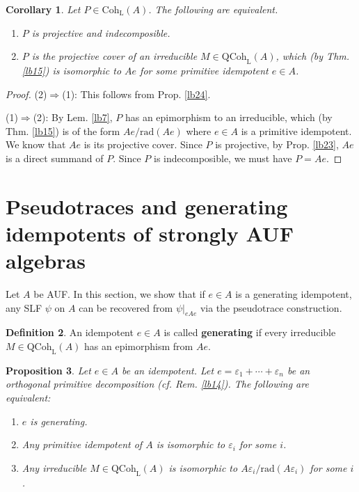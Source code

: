 \documentclass[11pt,b5paper,notitlepage]{article}
\theoremstyle{definition}
\newtheorem{df}{Definition}[section]
\theoremstyle{plain}
\newtheorem{pp}[df]{Proposition}
\newtheorem{co}[df]{Corollary}
\newcommand{\eps}{\varepsilon}
\newcommand{\QC}{\mathrm{QCoh}_{\mathrm L}}
\newcommand{\Coh}{\mathrm{Coh}_{\mathrm L}}
\newcommand{\rad}{\mathrm{rad}}
\numberwithin{equation}{section}
\begin{document}
\begin{co}\label{lb25}
Let $P\in\Coh(A)$. The following are equivalent.
\begin{enumerate}[label=(\arabic*)]
\item $P$ is projective and indecomposible.
\item $P$ is the projective cover of an irreducible $M\in\QC(A)$, which (by Thm. \ref{lb15}) is isomorphic to $Ae$ for some primitive idempotent $e\in A$.
\end{enumerate}
\end{co}


\begin{proof}
(2)$\Rightarrow$(1): This follows from Prop. \ref{lb24}.

(1)$\Rightarrow$(2): By Lem. \ref{lb7}, $P$ has an epimorphism to an irreducible, which (by Thm. \ref{lb15}) is of the form $Ae/\rad(Ae)$ where $e\in A$ is a primitive idempotent. We know that $Ae$ is its projective cover. Since $P$ is projective, by Prop. \ref{lb23}, $Ae$ is a direct summand of $P$. Since $P$ is indecomposible, we must have $P=Ae$.
\end{proof}












\section{Pseudotraces and generating idempotents of strongly AUF algebras}

Let $A$ be AUF. In this section, we show that if $e\in A$ is a generating idempotent, any SLF $\psi$ on $A$ can be recovered from $\psi|_{eAe}$ via the pseudotrace construction. 

\begin{df}\label{lb28}
An idempotent $e\in A$ is called \textbf{generating} if every irreducible $M\in\QC(A)$ has an epimorphism from $Ae$.
\end{df}

\begin{pp}\label{lb16}
Let $e\in A$ be an idempotent. Let $e=\eps_1+\cdots+\eps_n$ be an orthogonal primitive decomposition (cf. Rem. \ref{lb14}). The following are equivalent:
\begin{enumerate}[label=(\arabic*)]
\item $e$ is generating.
\item Any primitive idempotent of $A$ is isomorphic to $\eps_i$ for some $i$.
\item Any irreducible $M\in\QC(A)$ is isomorphic to $A\eps_i/\rad(A\eps_i)$ for some $i$.
\end{enumerate}
\end{pp}
\end{document}
